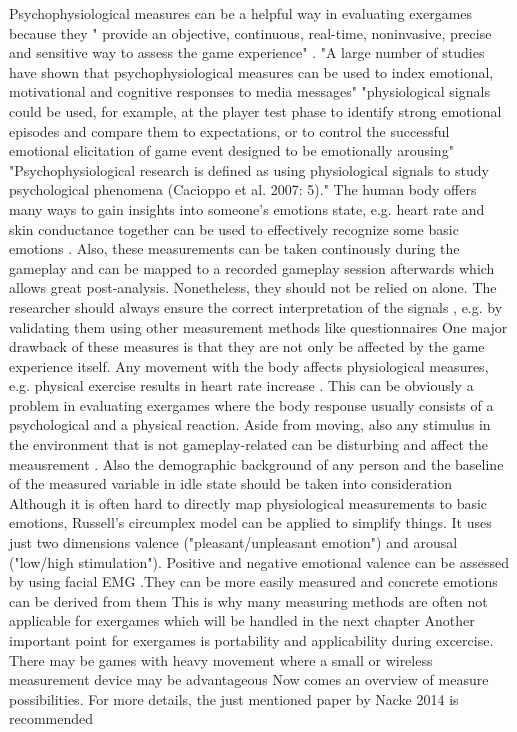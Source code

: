 Psychophysiological measures can be a helpful way in evaluating exergames because they " provide an objective, continuous, real-time, noninvasive, precise and sensitive way to assess the game experience" \cite{kivikangas2011review}. 
"A large number of studies have shown that psychophysiological measures can be used to index emotional, motivational and cognitive responses to media messages" \cite{kivikangas2011review}
"physiological signals could be used, for example, at the player test phase to identify strong emotional
episodes and compare them to expectations, or to control the successful emotional elicitation of game event designed to be emotionally arousing" \cite{kivikangas2011review}
"Psychophysiological research is defined as using physiological signals to study
psychological phenomena (Cacioppo et al. 2007: 5)." \cite{kivikangas2011review}
The human body offers many ways to gain insights into someone's emotions state, e.g. heart rate and skin conductance together can be used to effectively recognize some basic emotions \cite{hamdi2015emotion}. Also, these measurements can be taken continously during the gameplay and can be mapped to a recorded gameplay session afterwards \cite{nacke2015physiological} which allows great post-analysis. Nonetheless, they should not be relied on alone. The researcher should always ensure the correct interpretation of the signals \cite{nacke2015physiological}, e.g. by validating them using other measurement methods like questionnaires 
One major drawback of these measures is that they are not only be affected by the game experience itself. Any movement with the body affects physiological measures, e.g. physical exercise results in heart rate increase \cite{javorka2002heart}. This can be obviously a problem in evaluating exergames where the body response usually consists of a psychological and a physical reaction. Aside from moving, also any stimulus in the environment that is not gameplay-related can be disturbing and affect the meausrement \cite{nacke2015physiological}. Also the demographic background of any person and the baseline of the measured variable in idle state should be taken into consideration \cite{nacke2015physiological} 
Although it is often hard to directly map physiological measurements to basic emotions, Russell’s circumplex model can be applied to simplify things. It uses just two dimensions valence ("pleasant/unpleasant emotion") and arousal ("low/high stimulation"). Positive and negative emotional valence can be assessed by using facial EMG \cite{kivikangas2011review}.They can be more easily measured and concrete emotions can be derived from them \cite{seo2019automatic} 
This is why many measuring methods are often not applicable for exergames which will be handled in the next chapter 
Another important point for exergames is portability and applicability during excercise. There may be games with heavy movement where a small or wireless measurement device may be advantageous 
Now comes an overview of measure possibilities. For more details, the just mentioned paper by Nacke 2014 is recommended 


